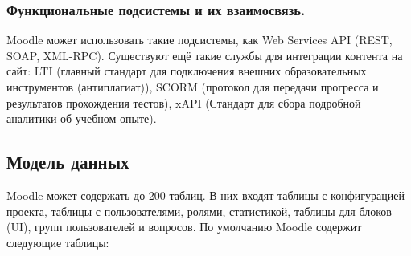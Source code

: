 \documentclass[a4paper, 14pt]{extarticle}
\begin{document}
\subsubsection{Функциональные подсистемы и их взаимосвязь.}
Moodle может использовать такие подсистемы, как Web Services API
(REST, SOAP, XML-RPC). Существуют ещё такие службы для интеграции
контента на сайт: LTI (главный стандарт для подключения внешних
образовательных инструментов (антиплагиат)), SCORM (протокол для
передачи прогресса и результатов прохождения тестов), xAPI (Стандарт
для сбора подробной аналитики об учебном опыте).
\subsection{Модель данных}
Moodle может содержать до 200 таблиц. В них входят таблицы с
конфигурацией проекта, таблицы с пользователями, ролями, статистикой,
таблицы для блоков (UI), групп пользователей и вопросов.
По умолчанию Moodle содержит следующие таблицы:
\end{document}
